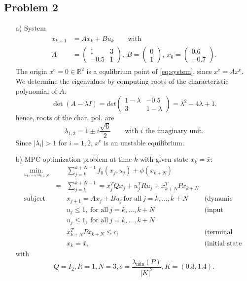 \documentclass[]{article}
\newcommand{\trp}{^T}
\newcommand{\xj}{x_j}
\newcommand{\xk}{x_k}
\newcommand{\uj}{u_j}
\newcommand{\uk}{u_k}
\newcommand{\xnull}{x_0}
\newcommand{\xeq}{x^{\mathrm{e}}}
\newcommand{\matricks}[4]{\begin{pmatrix}#1 & #2 \\ #3 & #4 \end{pmatrix}}
\newcommand{\xkplus}{x_{k+1}}
\newcommand{\xbar}{\bar{x}}
\newcommand{\vectortwo}[2]{\begin{pmatrix}
		#1 \\ #2
\end{pmatrix}}
\newcommand{\R}{\mathbb{R}}
\newcommand{\lambdamin}{\lambda_{\mathrm{min}}}
\begin{document}
\subsection*{Problem 2}
		\begin{enumerate}
			\item[a)] System
					\begin{align}
					\begin{split} \label{eq:system}
						\xkplus &= A \xk + B \uk \qquad \text{with}\\
						A &= \matricks{1}{3}{-0.5}{1}, \ B = \vectortwo{0}{1},\ \xnull = \vectortwo{0.6}{-0.7}.
					\end{split}
					\end{align}
					The origin $ \xeq = 0 \in \R^2 $ is a equlibrium point of \eqref{eq:system}, since $ \xeq = A \xeq. $
					We determine the eigenvalues by computing roots of the characteristic polynomial of $ A $.
					\[ \det(A - \lambda I) = det\matricks{1-\lambda}{-0.5}{3}{1-\lambda} = \lambda^2 -4\lambda + 1. \]
					hence, roots of the char. pol. are
					\[ \lambda_{1,2} = 1 \pm i \frac{\sqrt{6}}{2} \qquad \text{with }i\text{ the imaginary unit.}\]
					Since $ |\lambda_i | > 1  $ for $ i=1,2 $, $ \xeq $ is an unstable equilibrium.
					
			\item[b)] MPC optimization problem at time $ k $ with given state $ x_k = \xbar $:
				\begin{equation}
				\begin{aligned} \label{eq:MPCproblem}
				& \underset{u_k,\dots, u_{k+N}}{\text{min.}}
				& & \sum_{j = k}^{k + N -1} f_0(\xj,\uj) + \phi(x_{k+N})\\  & & = &\sum_{j = k}^{k + N -1}  = \xj \trp Q \xj + \uj \trp R \uj + x_{k + N} \trp P x_{k + N}\\
				& \text{subject to}
				& & x_{j+1} =A \xj + B \uj \ \text{for all} \ j = k,\dots,k+N &\text{(dynamic constraints)}\\
				& & & \uj \leq 1, \ \text{for all} \ j = k,\dots,k+N &\text{(input constraints)}\\ 
				& & & \uj \leq 1, \ \text{for all} \ j = k,\dots,k+N\\
				& & & x_{k+N}\trp P x_{k+N} \leq c, &\text{(terminal constraint)}\\
				& & & \xk = \xbar, &\text{(initial state constraint)}
				\end{aligned}
				\end{equation}
				with \[ Q = I_2, R = 1, N = 3, c = \frac{\lambdamin (P)}{|K|^2}, K = (0.3 , 1.4). \]
		\end{enumerate}	
\end{document}

